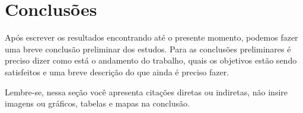 \chapter{Conclusões} \label{cap:06}

Após escrever os resultados encontrando até o presente momento, podemos fazer uma breve conclusão preliminar dos estudos. Para as conclusões preliminares é preciso dizer como está o andamento do trabalho, quais os objetivos estão sendo satisfeitos e uma breve descrição do que ainda é preciso fazer.

Lembre-se, nessa seção você apresenta citações diretas ou indiretas, não insire imagens ou gráficos, tabelas e mapas na conclusão.